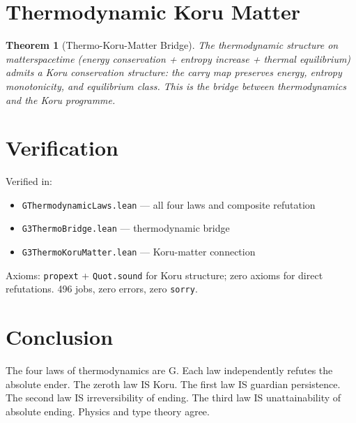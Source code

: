 \documentclass[12pt,a4paper]{article}
\newtheorem{theorem}{Theorem}[section]
\begin{document}
\section{Thermodynamic Koru Matter}

\begin{theorem}[Thermo-Koru-Matter Bridge]\label{thm:bridge}
The thermodynamic structure on matterspacetime (energy conservation +
entropy increase + thermal equilibrium) admits a Koru conservation
structure: the carry map preserves energy, entropy monotonicity, and
equilibrium class. This is the bridge between thermodynamics and
the Koru programme.
\end{theorem}

\section{Verification}

Verified in:
\begin{itemize}
    \item \texttt{GThermodynamicLaws.lean} --- all four laws and composite refutation
    \item \texttt{G3ThermoBridge.lean} --- thermodynamic bridge
    \item \texttt{G3ThermoKoruMatter.lean} --- Koru-matter connection
\end{itemize}

Axioms: \texttt{propext} + \texttt{Quot.sound} for Koru structure;
zero axioms for direct refutations. 496 jobs, zero errors, zero \texttt{sorry}.

\section{Conclusion}

The four laws of thermodynamics are G. Each law independently refutes
the absolute ender. The zeroth law IS Koru. The first law IS guardian
persistence. The second law IS irreversibility of ending. The third
law IS unattainability of absolute ending. Physics and type theory agree.
\end{document}
